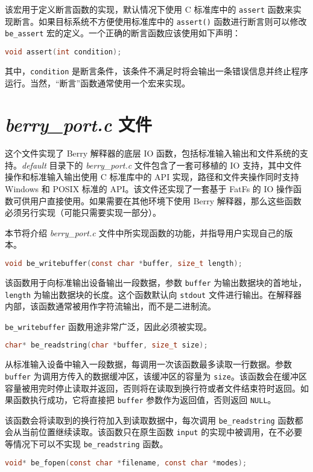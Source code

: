 
该宏用于定义断言函数的实现，默认情况下使用 C 标准库中的 \texttt{assert} 函数来实现断言。如果目标系统不方便使用标准库中的 \texttt{assert()} 函数进行断言则可以修改 \texttt{be\_assert} 宏的定义。一个正确的断言函数应该使用如下声明：

\begin{lstlisting}[language=c, numbers=none]
void assert(int condition);
\end{lstlisting}

其中，\texttt{condition} 是断言条件，该条件不满足时将会输出一条错误信息并终止程序运行。当然，“断言”函数通常使用一个宏来实现。

\section{\textsl{berry\_port.c} 文件}

这个文件实现了 Berry 解释器的底层 IO 函数，包括标准输入输出和文件系统的支持。\textsl{default} 目录下的 \textsl{berry\_port.c} 文件包含了一套可移植的 IO 支持，其中文件操作和标准输入输出使用 C 标准库中的 API 实现，路径和文件夹操作同时支持 Windows 和 POSIX 标准的 API。该文件还实现了一套基于 FatFs 的 IO 操作函数可供用户直接使用。如果需要在其他环境下使用 Berry 解释器，那么这些函数必须另行实现（可能只需要实现一部分）。

本节将介绍 \textsl{berry\_port.c} 文件中所实现函数的功能，并指导用户实现自己的版本。


\begin{lstlisting}[language=c, numbers=none]
void be_writebuffer(const char *buffer, size_t length);
\end{lstlisting}

该函数用于向标准输出设备输出一段数据，参数 \texttt{buffer} 为输出数据块的首地址，\texttt{length} 为输出数据块的长度。这个函数默认向 \texttt{stdout} 文件进行输出。在解释器内部，该函数通常被用作字符流输出，而不是二进制流。

\texttt{be\_writebuffer} 函数用途非常广泛，因此必须被实现。


\begin{lstlisting}[language=c, numbers=none]
char* be_readstring(char *buffer, size_t size);
\end{lstlisting}

从标准输入设备中输入一段数据，每调用一次该函数最多读取一行数据。参数 \texttt{buffer} 为调用方传入的数据缓冲区，该缓冲区的容量为 \texttt{size}。该函数会在缓冲区容量被用完时停止读取并返回，否则将在读取到换行符或者文件结束符时返回。如果函数执行成功，它将直接把 \texttt{buffer} 参数作为返回值，否则返回 \texttt{NULL}。

该函数会将读取到的换行符加入到读取数据中，每次调用 \texttt{be\_readstring} 函数都会从当前位置继续读取。该函数只在原生函数 \texttt{input} 的实现中被调用，在不必要等情况下可以不实现 \texttt{be\_readstring} 函数。


\begin{lstlisting}[language=c, numbers=none]
void* be_fopen(const char *filename, const char *modes);
\end{lstlisting}
